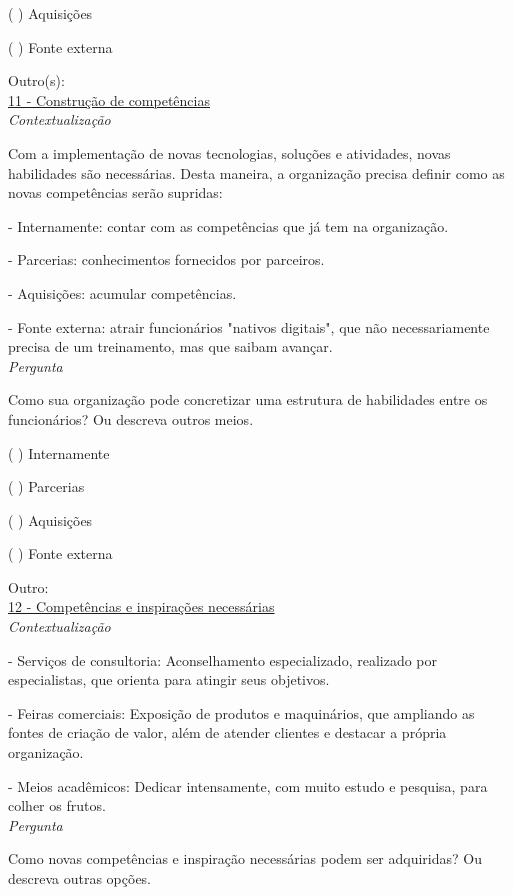 ( ) Aquisições

( ) Fonte externa

Outro(s):\\


\underline{11 - Construção de competências}\\

\textit{Contextualização}

Com a implementação de novas tecnologias, soluções e atividades, novas habilidades são necessárias. Desta maneira, a organização precisa definir como as novas competências serão supridas:

- Internamente: contar com as competências que já tem na organização.

- Parcerias: conhecimentos fornecidos por parceiros.

- Aquisições: acumular competências.

- Fonte externa: atrair funcionários "nativos digitais", que não necessariamente precisa de um treinamento, mas que saibam avançar.\\


\textit{Pergunta}

Como sua organização pode concretizar uma estrutura de habilidades entre os funcionários? Ou descreva outros meios.

( ) Internamente

( ) Parcerias

( ) Aquisições

( ) Fonte externa

Outro:\\


\underline{12 - Competências e inspirações necessárias}\\

\textit{Contextualização}

- Serviços de consultoria: Aconselhamento especializado, realizado por especialistas, que orienta para atingir seus objetivos.

- Feiras comerciais: Exposição de produtos e maquinários, que ampliando as fontes de criação de valor, além de atender clientes e destacar a própria organização.

- Meios acadêmicos: Dedicar intensamente, com muito estudo e pesquisa, para colher os frutos.\\


\textit{Pergunta}

Como novas competências e inspiração necessárias podem ser adquiridas? Ou descreva outras opções.

